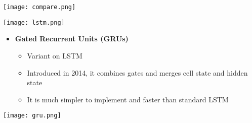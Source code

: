 \documentclass[11pt]{article}
\begin{document}
\begin{center}
\texttt{[image: compare.png]}
\end{center}
\begin{center}
\texttt{[image: lstm.png]}
\end{center}
\begin{itemize}
\item \textbf{Gated Recurrent Units (GRUs)}
\begin{itemize}
\item Variant on LSTM
\item Introduced in 2014, it combines gates and
merges cell state and hidden state
\item It is much simpler to implement and faster than standard LSTM
\end{itemize}
\end{itemize}
\begin{center}
\texttt{[image: gru.png]}
\end{center}
\end{document}
